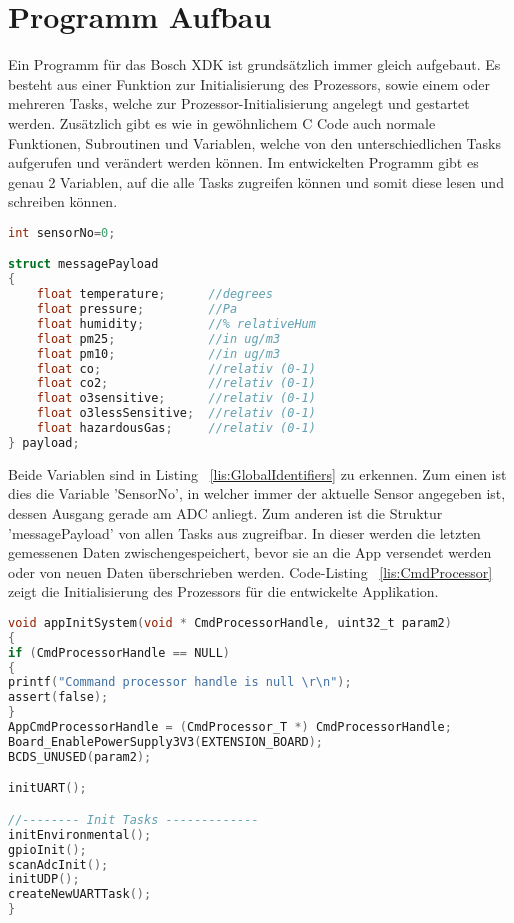 \section{Programm Aufbau}\label{sec:ProgrammAufbau}
Ein Programm für das Bosch \acs{XDK} ist grundsätzlich immer gleich aufgebaut. Es besteht aus einer Funktion zur Initialisierung des Prozessors, sowie einem oder mehreren Tasks, welche zur Prozessor-Initialisierung angelegt und gestartet werden. Zusätzlich gibt es wie in gewöhnlichem C Code auch normale Funktionen, Subroutinen und Variablen, welche von den unterschiedlichen Tasks aufgerufen und verändert werden können. Im entwickelten Programm gibt es genau 2 Variablen, auf die alle Tasks zugreifen können und somit diese lesen und schreiben können. 
\newline
\begin{lstlisting}[language=C, caption={Geteilte Variablen}, label=lis:GlobalIdentifiers]
int sensorNo=0;

struct messagePayload
{
	float temperature;		//degrees
	float pressure;			//Pa
	float humidity;			//% relativeHum
	float pm25; 			//in ug/m3
	float pm10; 			//in ug/m3
	float co;				//relativ (0-1)
	float co2; 				//relativ (0-1)
	float o3sensitive; 		//relativ (0-1)
	float o3lessSensitive;	//relativ (0-1)
	float hazardousGas;		//relativ (0-1)
} payload;
\end{lstlisting}
Beide Variablen sind in Listing ~\ref{lis:GlobalIdentifiers} zu erkennen. 
\newline
Zum einen ist dies die Variable 'SensorNo', in welcher immer der aktuelle Sensor angegeben ist, dessen Ausgang gerade am \acs{ADC} anliegt. 
\newline
Zum anderen ist die Struktur 'messagePayload' von allen Tasks aus zugreifbar. In dieser werden die letzten gemessenen Daten zwischengespeichert, bevor sie an die App versendet werden oder von neuen Daten überschrieben werden.
\newline
\newline
Code-Listing ~\ref{lis:CmdProcessor} zeigt die Initialisierung des Prozessors für die entwickelte Applikation.
\begin{lstlisting}[language=C, caption={Prozessor Initialisierung}, label=lis:CmdProcessor]
void appInitSystem(void * CmdProcessorHandle, uint32_t param2)
{
if (CmdProcessorHandle == NULL)
{
printf("Command processor handle is null \r\n");
assert(false);
}
AppCmdProcessorHandle = (CmdProcessor_T *) CmdProcessorHandle;
Board_EnablePowerSupply3V3(EXTENSION_BOARD);
BCDS_UNUSED(param2);

initUART();

//-------- Init Tasks -------------
initEnvironmental();
gpioInit();
scanAdcInit();
initUDP();
createNewUARTTask();
}
\end{lstlisting}
